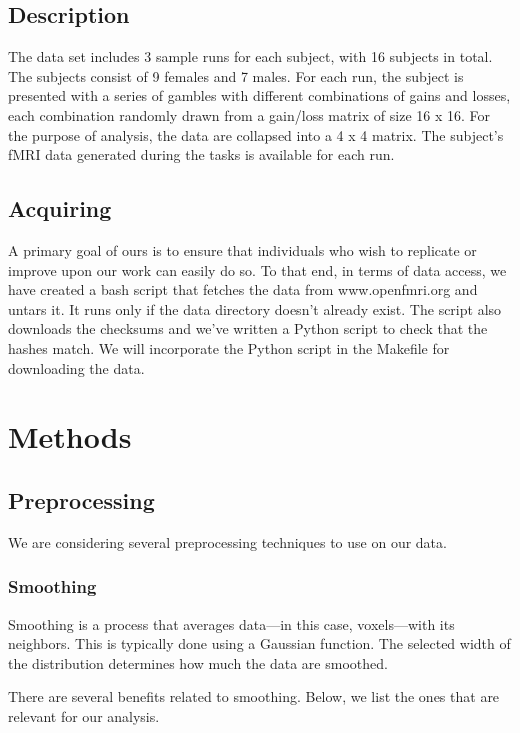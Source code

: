 \documentclass[11pt]{article}
\begin{document}
\subsection{Description}

The data set includes 3 sample runs for each subject, with 16 subjects in
total. The subjects consist of 9 females and 7 males. For each run, the subject
is presented with a series of gambles with different combinations of gains and
losses, each combination randomly drawn from a gain/loss matrix of size 16 x
16. For the purpose of analysis, the data are collapsed into a 4 x 4 matrix.
The subject’s fMRI data generated during the tasks is available for each run.

\subsection{Acquiring}

A primary goal of ours is to ensure that individuals who wish to replicate or
improve upon our work can easily do so. To that end, in terms of data access,
we have created a bash script that fetches the data from www.openfmri.org and
untars it. It runs only if the data directory doesn't already exist. The script
also downloads the checksums and we've written a Python script to check that
the hashes match. We will incorporate the Python script in the Makefile for
downloading the data.

\section{Methods}

\subsection{Preprocessing}

We are considering several preprocessing techniques to use on our data.

\subsubsection{Smoothing}

Smoothing is a process that averages data---in this case, voxels---with its
neighbors. This is typically done using a Gaussian function. The selected width
of the distribution determines how much the data are smoothed.

There are several benefits related to smoothing. Below, we list the ones that
are relevant for our analysis.
\end{document}

